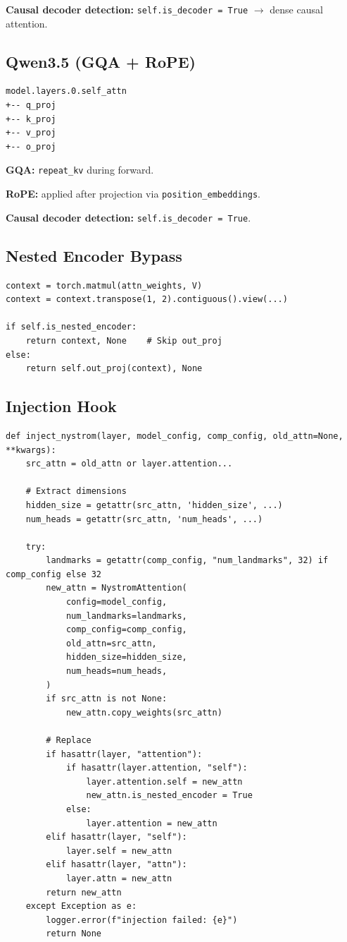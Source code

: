 \textbf{Causal decoder detection:} \texttt{self.is\_decoder = True} $\to$ dense causal 
attention.

\subsection{Qwen3.5 (GQA + RoPE)}

\begin{lstlisting}
model.layers.0.self_attn
+-- q_proj
+-- k_proj
+-- v_proj
+-- o_proj
\end{lstlisting}

\textbf{GQA:} \texttt{repeat\_kv} during forward.

\textbf{RoPE:} applied after projection via \texttt{position\_embeddings}.

\textbf{Causal decoder detection:} \texttt{self.is\_decoder = True}.

\subsection{Nested Encoder Bypass}

\begin{lstlisting}
context = torch.matmul(attn_weights, V)
context = context.transpose(1, 2).contiguous().view(...)

if self.is_nested_encoder:
    return context, None    # Skip out_proj
else:
    return self.out_proj(context), None
\end{lstlisting}

\subsection{Injection Hook}

\begin{lstlisting}
def inject_nystrom(layer, model_config, comp_config, old_attn=None, **kwargs):
    src_attn = old_attn or layer.attention...
    
    # Extract dimensions
    hidden_size = getattr(src_attn, 'hidden_size', ...)
    num_heads = getattr(src_attn, 'num_heads', ...)
    
    try:
        landmarks = getattr(comp_config, "num_landmarks", 32) if comp_config else 32
        new_attn = NystromAttention(
            config=model_config,
            num_landmarks=landmarks,
            comp_config=comp_config,
            old_attn=src_attn,
            hidden_size=hidden_size,
            num_heads=num_heads,
        )
        if src_attn is not None:
            new_attn.copy_weights(src_attn)
        
        # Replace
        if hasattr(layer, "attention"):
            if hasattr(layer.attention, "self"):
                layer.attention.self = new_attn
                new_attn.is_nested_encoder = True
            else:
                layer.attention = new_attn
        elif hasattr(layer, "self"):
            layer.self = new_attn
        elif hasattr(layer, "attn"):
            layer.attn = new_attn
        return new_attn
    except Exception as e:
        logger.error(f"injection failed: {e}")
        return None
\end{lstlisting}

